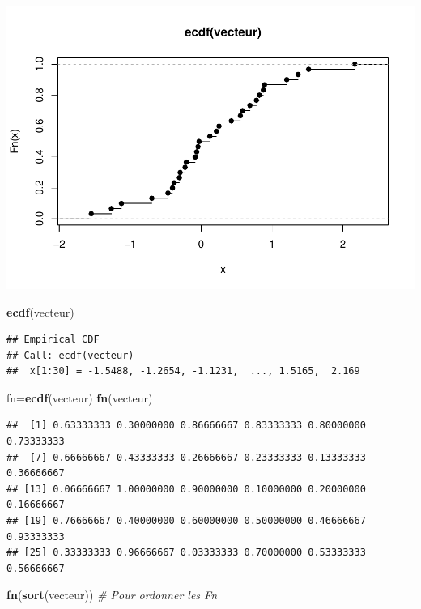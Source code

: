 \documentclass[
  12pt,
]{article}
\newenvironment{Shaded}{\begin{snugshade}}{\end{snugshade}}
\newcommand{\CommentTok}[1]{\textcolor[rgb]{0.56,0.35,0.01}{\textit{#1}}}
\newcommand{\FunctionTok}[1]{\textcolor[rgb]{0.13,0.29,0.53}{\textbf{#1}}}
\newcommand{\NormalTok}[1]{#1}
\newcommand{\OtherTok}[1]{\textcolor[rgb]{0.56,0.35,0.01}{#1}}
\begin{document}
\includegraphics{Stat_non_para_files/figure-latex/unnamed-chunk-14-1.pdf}

\begin{Shaded}
\begin{Highlighting}[]
\FunctionTok{ecdf}\NormalTok{(vecteur)}
\end{Highlighting}
\end{Shaded}

\begin{verbatim}
## Empirical CDF 
## Call: ecdf(vecteur)
##  x[1:30] = -1.5488, -1.2654, -1.1231,  ..., 1.5165,  2.169
\end{verbatim}

\begin{Shaded}
\begin{Highlighting}[]
\NormalTok{fn}\OtherTok{=}\FunctionTok{ecdf}\NormalTok{(vecteur)}
\FunctionTok{fn}\NormalTok{(vecteur)}
\end{Highlighting}
\end{Shaded}

\begin{verbatim}
##  [1] 0.63333333 0.30000000 0.86666667 0.83333333 0.80000000 0.73333333
##  [7] 0.66666667 0.43333333 0.26666667 0.23333333 0.13333333 0.36666667
## [13] 0.06666667 1.00000000 0.90000000 0.10000000 0.20000000 0.16666667
## [19] 0.76666667 0.40000000 0.60000000 0.50000000 0.46666667 0.93333333
## [25] 0.33333333 0.96666667 0.03333333 0.70000000 0.53333333 0.56666667
\end{verbatim}

\begin{Shaded}
\begin{Highlighting}[]
\FunctionTok{fn}\NormalTok{(}\FunctionTok{sort}\NormalTok{(vecteur)) }\CommentTok{\# Pour ordonner les Fn}
\end{Highlighting}
\end{Shaded}
\end{document}
